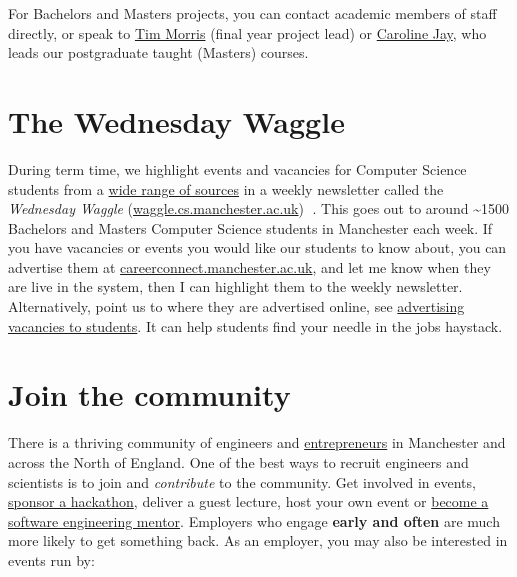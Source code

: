 \documentclass[
  12pt,
]{book}
\begin{document}
For Bachelors and Masters projects, you can contact academic members of staff directly, or speak to \href{https://www.research.manchester.ac.uk/portal/tim.morris.html}{Tim Morris} (final year project lead) or \href{https://www.research.manchester.ac.uk/portal/caroline.jay.html}{Caroline Jay}, who leads our postgraduate taught (Masters) courses.

\hypertarget{the-wednesday-waggle}{%
\section{The Wednesday Waggle}\label{the-wednesday-waggle}}

During term time, we highlight events and vacancies for Computer Science students from a \href{https://www.cdyf.me/finding}{wide range of sources} in a weekly newsletter called the \emph{Wednesday Waggle} (\href{https://waggle.cs.manchester.ac.uk/waggle/about}{waggle.cs.manchester.ac.uk}) 🐝. This goes out to around \textasciitilde1500 Bachelors and Masters Computer Science students in Manchester each week. If you have vacancies or events you would like our students to know about, you can advertise them at \href{https://careerconnect.manchester.ac.uk/}{careerconnect.manchester.ac.uk}, and let me know when they are live in the system, then I can highlight them to the weekly newsletter. Alternatively, point us to where they are advertised online, see \href{https://www.cdyf.me/finding\#studentjobs}{advertising vacancies to students}. It can help students find your needle in the jobs haystack.

\hypertarget{join-the-community}{%
\section{Join the community}\label{join-the-community}}

There is a thriving community of engineers and \href{https://www.accelerateme.co/}{entrepreneurs} in Manchester and across the North of England. One of the best ways to recruit engineers and scientists is to join and \emph{contribute} to the community. Get involved in events, \href{https://www.unicsmcr.com/}{sponsor a hackathon}, deliver a guest lecture, host your own event or \href{https://www.cs.manchester.ac.uk/connect/business-engagement/industrial-mentoring/}{become a software engineering mentor}. Employers who engage \textbf{early and often} are much more likely to get something back. As an employer, you may also be interested in events run by:
\end{document}
